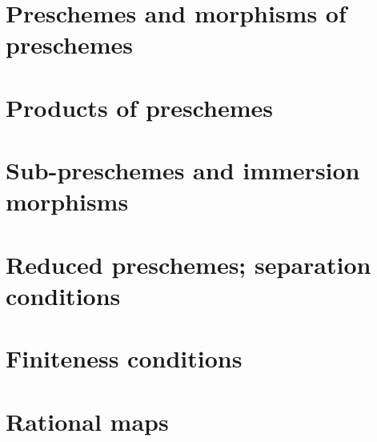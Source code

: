 \documentclass[10pt,oneside]{amsart}
\begin{document}
        
       
        
       
        
      
        
       
        
       
        

    \section{Preschemes and morphisms of preschemes}

        

        

        

        
        
        

    \section{Products of preschemes}

    \section{Sub-preschemes and immersion morphisms}

    \section{Reduced preschemes; separation conditions}

    \section{Finiteness conditions}

    \section{Rational maps}
\end{document}
